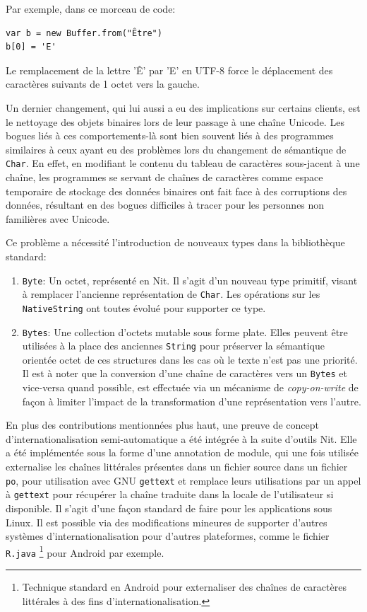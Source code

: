 Par exemple, dans ce morceau de code:

\begin{verbatim}
var b = new Buffer.from("Être")
b[0] = 'E'
\end{verbatim}

Le remplacement de la lettre 'Ê' par 'E' en UTF-8 force le déplacement des caractères suivants de 1 octet vers la
gauche.

Un dernier changement, qui lui aussi a eu des implications sur certains clients, est le nettoyage des objets binaires
lors de leur passage à une chaîne Unicode.
Les bogues liés à ces comportements-là sont bien souvent liés à des programmes similaires à ceux ayant eu des problèmes
lors du changement de sémantique de \texttt{Char}.
En effet, en modifiant le contenu du tableau de caractères sous-jacent à une chaîne, les programmes se servant de
chaînes de caractères comme espace temporaire de stockage des données binaires ont fait face à des corruptions des
données, résultant en des bogues difficiles à tracer pour les personnes non familières avec Unicode.

Ce problème a nécessité l'introduction de nouveaux types dans la bibliothèque standard:

\begin{enumerate}
	\item \texttt{Byte}: Un octet, représenté en Nit. Il s'agit d'un nouveau type primitif, visant
		à remplacer l'ancienne représentation de \texttt{Char}. Les opérations sur les \texttt{NativeString}
		ont toutes évolué pour supporter ce type.
	\item \texttt{Bytes}: Une collection d'octets mutable sous forme plate. Elles peuvent être utilisées
		à la place des anciennes \texttt{String} pour préserver la sémantique orientée octet de ces
		structures dans les cas où le texte n'est pas une priorité. Il est à noter que la conversion
		d'une chaîne de caractères vers un \texttt{Bytes} et vice-versa quand possible, 
		est effectuée via un mécanisme de \textit{copy-on-write}
		de façon à limiter l'impact de la transformation d'une représentation vers l'autre.
\end{enumerate}

En plus des contributions mentionnées plus haut, une preuve de concept d'internationalisation semi-automatique
a été intégrée à la suite d'outils Nit.
Elle a été implémentée sous la forme d'une annotation de module, qui une fois utilisée externalise les chaînes
littérales présentes dans un fichier source dans un fichier \texttt{po}, pour utilisation avec GNU \texttt{gettext}
et remplace leurs utilisations par un appel à \texttt{gettext} pour récupérer la chaîne traduite dans la locale
de l'utilisateur si disponible.
Il s'agit d'une façon standard de faire pour les applications sous Linux.
Il est possible via des modifications mineures de supporter d'autres systèmes d'internationalisation pour d'autres
plateformes, comme le fichier \texttt{R.java}
\footnote{Technique standard en Android pour externaliser des chaînes de caractères littérales à des fins d'internationalisation.}
pour Android par exemple.

